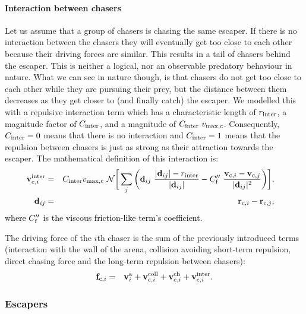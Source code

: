 \documentclass[12pt,a4paper,final]{iopart}
\newcommand{\revision}{\textcolor{black}}
\newcommand{\revisiontwo}{\textcolor{black}}
\begin{document}
\paragraph{Interaction between chasers} Let us assume that a group of chasers is chasing the same escaper. If there is no interaction between the chasers they will eventually get too close to each other because their driving forces are similar. This results in a tail of chasers behind the escaper. This is neither a logical, nor an observable predatory behaviour in nature. What we can see in nature though, is that chasers do not get too close to each other while they are pursuing their prey, but the distance between them decreases as they get closer to (and finally catch) the escaper. We modelled this with a repulsive interaction term which has a characteristic length of $r_{\rm inter}$,  a magnitude factor \revision{of} $C_{\rm inter}$, and a magnitude of $C_{\rm inter} \  v_{\rm max, c}$. Consequently, $C_{\rm inter} = 0$ means that there is no interaction and $C_{\rm inter} = 1$ means that the repulsion between chasers is just as strong as their attraction towards the escaper. The mathematical definition of this interaction is:
\begin{eqnarray}
\hspace{-1.5cm}{\bf v}_{{\rm c},i}^{\rm inter} &=& C_{\rm inter} \revision{{v}_{\rm max, c}} \  \mathcal{N} \bigg[ \sum_j \bigg( {\bf d}_{ij} \  \frac{| {\bf d}_{ij} | - r_{\rm inter}}{| {\bf d}_{ij} |}- C''_{\revisiontwo{\rm f}} \  \frac{{\bf v}_{\revision{{\rm c}}, i} - \revision{{\bf v}_{\revision{{\rm c}}, j} }}{| {\bf d}_{ij} |^2} \bigg) \bigg], \label{eq:inter}\\%
{\bf d}_{ij} &=& {\bf r}_{\revision{{\rm c}}, i} - {\bf r}_{\revision{{\rm c}}, j},
\end{eqnarray} 
\revision{where $C''_{\revisiontwo{\rm f}}$ is the viscous friction-like term's coefficient.}

The driving force of the $i$th chaser is the sum of the previously introduced terms (interaction with the wall of the arena, collision avoiding short-term repulsion, direct chasing force and the long-term repulsion between chasers):
\begin{eqnarray}
{\bf f}_{{\rm c}, i} &=& {\bf v}_{i}^{\rm a} + {\bf v}_{{\rm c}, i}^{\rm coll} + {\bf v}_{{\rm c}, i}^{\rm ch} + {\bf v}_{{\rm c}, i}^{\rm inter}.
\end{eqnarray}



\subsubsection{Escapers}
\end{document}
